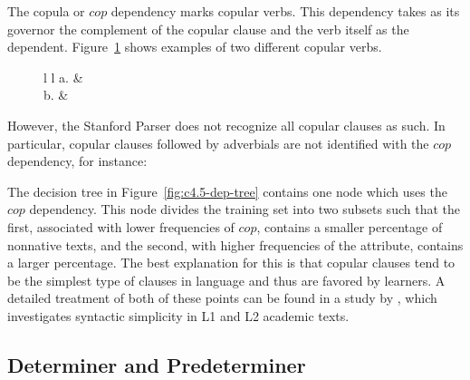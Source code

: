 \documentclass[main.tex]{subfiles}
\begin{document}
The copula or $cop$ dependency marks copular verbs. This dependency takes as its governor the complement of the copular clause and the verb itself as the dependent. Figure~\ref{ex:cop1} shows examples of two different copular verbs.
\begin{figure}[ht]
\centering
\begin{tabular}{ l l }
a. &
\\

b. &
\\
\end{tabular}
\label{ex:cop1}
\end{figure}
However, the Stanford Parser does not recognize all copular clauses as such. In particular, copular clauses followed by adverbials are not identified with the $cop$ dependency, for instance:

The decision tree in Figure~\ref{fig:c4.5-dep-tree} contains one node which uses the $cop$ dependency. This node divides the training set into two subsets such that the first, associated with lower frequencies of $cop$, contains a smaller percentage of nonnative texts, and the second, with higher frequencies of the attribute, contains a larger percentage. The best explanation for this is that copular clauses tend to be the simplest type of clauses in language and thus are favored by learners. A detailed treatment of both of these points can be found in a study by \citet{hinkel:2003}, which investigates syntactic simplicity in L1 and L2 academic texts.

\subsection{Determiner and Predeterminer}
\end{document}
